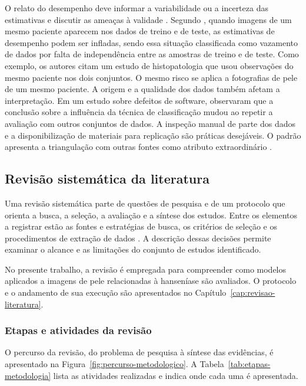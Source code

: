 O relato do desempenho deve informar a variabilidade ou a incerteza das
estimativas e discutir as ameaças à validade
\cite{acmSigsoftDataScience,wohlin2024}. Segundo ,
quando imagens de um mesmo paciente aparecem nos dados de treino e de teste,
as estimativas de desempenho podem ser infladas, sendo essa situação
classificada como vazamento de dados por falta de independência entre as
amostras de treino e de teste. Como exemplo, os autores
citam um estudo de histopatologia que usou observações do mesmo paciente nos
dois conjuntos. O mesmo risco se aplica a fotografias de pele de um mesmo
paciente. A origem e a qualidade dos dados
também afetam a interpretação. Em um estudo sobre defeitos de software,
 observaram que a conclusão sobre a influência da
técnica de classificação mudou ao repetir a avaliação com outros conjuntos
de dados. A inspeção manual de parte dos dados e a disponibilização de
materiais para replicação são práticas desejáveis. O padrão apresenta a
triangulação com outras fontes como atributo extraordinário
\cite{acmSigsoftDataScience}.

\subsection{Revisão sistemática da literatura}

Uma revisão sistemática parte de questões de pesquisa e de um protocolo
que orienta a busca, a seleção, a avaliação e a síntese dos estudos. Entre
os elementos a registrar estão as fontes e estratégias de busca, os critérios
de seleção e os procedimentos de extração de dados
\cite{kitchenham2007,wohlin2024}. A descrição dessas decisões permite
examinar o alcance e as limitações do conjunto de estudos identificado.

No presente trabalho, a revisão é empregada para compreender como modelos
aplicados a imagens de pele relacionadas à hanseníase são avaliados. O
protocolo e o andamento de sua execução são apresentados no
Capítulo~\ref{cap:revisao-literatura}.

\subsubsection{Etapas e atividades da revisão}\label{subsec:etapas-revisao}

O percurso da revisão, do problema de pesquisa à síntese das evidências, é
apresentado na Figura~\ref{fig:percurso-metodologico}. A
Tabela~\ref{tab:etapas-metodologia} lista as atividades realizadas e indica onde
cada uma é apresentada.

